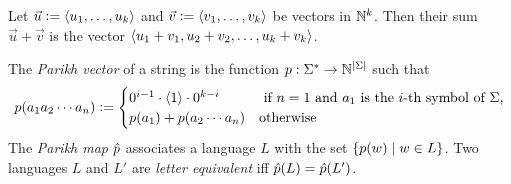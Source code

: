 \begin{definition}
    Let $\vec{u} \mathrel{\mathop:}= \left \langle u_1, \ldots, u_k \right \rangle $ and $\vec{v} \mathrel{\mathop:}= \left \langle v_1, \ldots, v_k \right \rangle $ be vectors in $\mathbb{N}^k$.
    Then their sum $\vec{u} + \vec{v}$ is the vector $\left \langle u_1 + v_1, u_2 +v_2, \ldots, u_k+v_k \right \rangle $.
\end{definition}

\begin{definition}
    The \emph{Parikh vector} of a string is the function $p: \Sigma^* \rightarrow \mathbb{N}^{| \Sigma |}$ such that
    \[
        p(a_1 a_2 \cdots a_n) \mathrel{\mathop:}=
            \begin{cases}
                0^{i-1} \cdot \left \langle 1 \right \rangle  \cdot 0^{k-i} & \text{ if $n = 1$ and $a_1$ is the $i$-th symbol of $\Sigma$,}\\
                p(a_1) + p(a_2 \cdots a_n) & \text{otherwise}
            \end{cases}
    \]
    The \emph{Parikh map} $\hat{p}$ associates a language $L$ with the set $\left \{  p(w) \mid w \in L \right \}$.
    Two languages $L$ and $L'$ are \emph{letter equivalent} iff $\hat{p}(L) = \hat{p}(L')$.
\end{definition}

